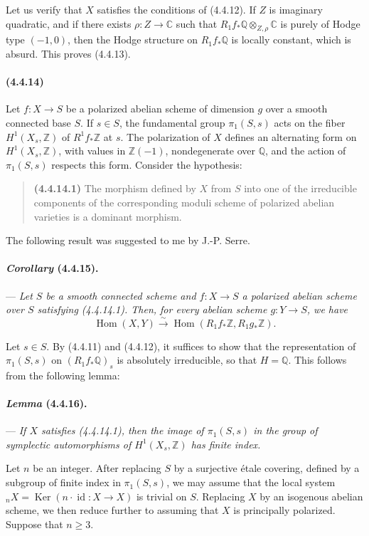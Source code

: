 \documentclass[10pt]{article}
\newcommand{\C}{\mathbb C}
\newcommand{\Q}{\mathbb Q}
\newcommand{\Z}{\mathbb Z}
\newcommand{\Ker}{\operatorname{Ker}}
\newcommand{\Hom}{\operatorname{Hom}}
\newcommand{\iso}{\xrightarrow{\sim}}
\begin{document}
Let us verify that $X$ satisfies the conditions of (4.4.12). If $Z$ is imaginary quadratic, and if there exists $\rho:Z\to\C$ such that $R_1f_*\Q\otimes_{Z,\rho}\C$ is purely of Hodge type $(-1,0)$, then the Hodge structure on $R_1f_*\Q$ is locally constant, which is absurd. This proves (4.4.13).

\paragraph{(4.4.14)} Let $f:X\to S$ be a polarized abelian scheme of dimension $g$ over a smooth connected base $S$. If $s\in S$, the fundamental group $\pi_1(S,s)$ acts on the fiber $H^1(X_s,\Z)$ of $R^1f_*\Z$ at $s$. The polarization of $X$ defines an alternating form on $H^1(X_s,\Z)$, with values in $\Z(-1)$, nondegenerate over $\Q$, and the action of $\pi_1(S,s)$ respects this form. Consider the hypothesis:
\begin{quote}
\noindent\textbf{(4.4.14.1)} The morphism defined by $X$ from $S$ into one of the irreducible components of the corresponding moduli scheme of polarized abelian varieties is a dominant morphism.
\end{quote}
The following result was suggested to me by J.-P. Serre.

\paragraph{\emph{Corollary} (4.4.15).} --- {\itshape Let $S$ be a smooth connected scheme and $f:X\to S$ a polarized abelian scheme over $S$ satisfying (4.4.14.1). Then, for every abelian scheme $g:Y\to S$, we have
\[
\Hom(X,Y)\iso\Hom(R_1f_*\Z,R_1g_*\Z).
\]}

Let $s\in S$. By (4.4.11) and (4.4.12), it suffices to show that the representation of $\pi_1(S,s)$ on $(R_1f_*\Q)_s$ is absolutely irreducible, so that $H=\Q$. This follows from the following lemma:

\paragraph{\emph{Lemma} (4.4.16).} --- {\itshape If $X$ satisfies (4.4.14.1), then the image of $\pi_1(S,s)$ in the group of symplectic automorphisms of $H^1(X_s,\Z)$ has finite index.}

Let $n$ be an integer. After replacing $S$ by a surjective étale covering, defined by a subgroup of finite index in $\pi_1(S,s)$, we may assume that the local system ${}_nX=\Ker(n\cdot \operatorname{id}:X\to X)$ is trivial on $S$. Replacing $X$ by an isogenous abelian scheme, we then reduce further to assuming that $X$ is principally polarized. Suppose that $n\ge3$.
\end{document}
